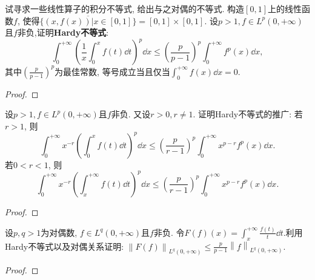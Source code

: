 \begin{quizb}
\begin{solution}
\end{solution}
\woe 试寻求一些线性算子的积分不等式, 给出与之对偶的不等式.
\woe 构造\([0,1]\)上的线性函数\(f\), 使得\(\overline{\{\left(x,f(x)\right)|x\in[0,1]\}}=[0,1]\times [0,1]\).
\woe 设\(p>1,f\in L^p(0,+\infty)\)且\(f\)非负,证明\textbf{Hardy不等式}:\[\int_{0}^{+\infty}\left(\frac{1}{x}\int_{0}^{x}f(t)\dd t\right)^p\dd x\leqslant\left(\frac{p}{p-1}\right)^p\int_{0}^{+\infty}f^p(x)\dd x,\]其中\(\left(\frac{p}{p-1}\right)^p\)为最佳常数, 等号成立当且仅当\(\int_{0}^{+\infty}f(x)\dd x=0\).
\begin{proof}

\end{proof}
\woe 设\(p>1,f\in L^p(0,+\infty)\)且\(f\)非负. 又设\(r>0,r\ne 1\). 证明Hardy不等式的推广: 若\(r>1\), 则\[\int_{0}^{+\infty}x^{-r}\left(\int_{0}^{x}f(t)\dd t\right)^p\dd x\leqslant\left(\frac{p}{r-1}\right)^p\int_{0}^{+\infty}x^{p-r}f^p(x)\dd x.\]若\(0<r<1\), 则\[\int_{0}^{+\infty}x^{-r}\left(\int_{x}^{+\infty}f(t)\dd t\right)^p\dd x\leqslant\left(\frac{p}{r-1}\right)^p\int_{0}^{+\infty}x^{p-r}f^p(x)\dd x.\]
\begin{proof}

\end{proof}
\woe 设\(p,q>1\)为对偶数, \(f\in L^q(0,+\infty)\)且\(f\)非负. 令\(F(f)(x)=\int_{x}^{+\infty}\frac{f(t)}{t}\dd t.\)利用Hardy不等式以及对偶关系证明: \(\left\|F(f)\right\|_{L^q(0,+\infty)}\leqslant\frac{p}{p-1}\left\|f\right\|_{L^q(0,+\infty)}\).
\begin{proof}

\end{proof}
\end{quizb}
